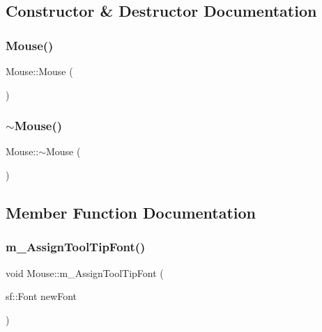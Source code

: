 \subsection{Constructor \& Destructor Documentation}
\mbox{\label{class_mouse_a99024d3700d649ae19c1537b42a3e86d}} 
\subsubsection{\texorpdfstring{Mouse()}{Mouse()}}
{\footnotesize\ttfamily Mouse\+::\+Mouse (\begin{DoxyParamCaption}{ }\end{DoxyParamCaption})}

\mbox{\label{class_mouse_afdf7d8abef29c10be77ead773f964f4f}} 
\subsubsection{\texorpdfstring{$\sim$\+Mouse()}{~Mouse()}}
{\footnotesize\ttfamily Mouse\+::$\sim$\+Mouse (\begin{DoxyParamCaption}{ }\end{DoxyParamCaption})}



\subsection{Member Function Documentation}
\mbox{\label{class_mouse_ac668f6d214750b0c426486dd56de5bb0}} 
\subsubsection{\texorpdfstring{m\+\_\+\+Assign\+Tool\+Tip\+Font()}{m\_AssignToolTipFont()}}
{\footnotesize\ttfamily void Mouse\+::m\+\_\+\+Assign\+Tool\+Tip\+Font (\begin{DoxyParamCaption}\item[{sf\+::\+Font}]{new\+Font }\end{DoxyParamCaption})}

